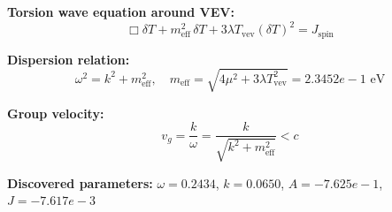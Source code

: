 
\textbf{Torsion wave equation around VEV:}
\begin{equation}
  \Box \delta T + m_{\text{eff}}^2 \, \delta T + 3\lambda T_{\text{vev}} (\delta T)^2 = J_{\text{spin}}
\end{equation}

\textbf{Dispersion relation:}
\begin{equation}
  \omega^2 = k^2 + m_{\text{eff}}^2, \quad
  m_{\text{eff}} = \sqrt{4\mu^2 + 3\lambda T_{\text{vev}}^2} = 2.3452e-1 \text{ eV}
\end{equation}

\textbf{Group velocity:}
\begin{equation}
  v_g = \frac{k}{\omega} = \frac{k}{\sqrt{k^2 + m_{\text{eff}}^2}} < c
\end{equation}

\textbf{Discovered parameters:}
$\omega = 0.2434$, \quad
$k = 0.0650$, \quad
$A = -7.625e-1$, \quad
$J = -7.617e-3$